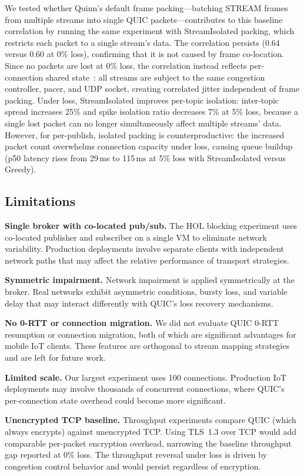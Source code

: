 We tested whether Quinn's default frame packing---batching STREAM frames from multiple streams into single QUIC packets---contributes to this baseline correlation by running the same experiment with StreamIsolated packing, which restricts each packet to a single stream's data. The correlation persists (0.64 versus 0.60 at 0\% loss), confirming that it is not caused by frame co-location. Since no packets are lost at 0\% loss, the correlation instead reflects per-connection shared state~\cite{rfc9002, rfc9308}: all streams are subject to the same congestion controller, pacer, and UDP socket, creating correlated jitter independent of frame packing. Under loss, StreamIsolated improves per-topic isolation: inter-topic spread increases 25\% and spike isolation ratio decreases 7\% at 5\% loss, because a single lost packet can no longer simultaneously affect multiple streams' data. However, for per-publish, isolated packing is counterproductive: the increased packet count overwhelms connection capacity under loss, causing queue buildup (p50 latency rises from 29\,ms to 115\,ms at 5\% loss with StreamIsolated versus Greedy).

\subsection{Limitations}

\textbf{Single broker with co-located pub/sub.} The HOL blocking experiment uses co-located publisher and subscriber on a single VM to eliminate network variability. Production deployments involve separate clients with independent network paths that may affect the relative performance of transport strategies.

\textbf{Symmetric impairment.} Network impairment is applied symmetrically at the broker. Real networks exhibit asymmetric conditions, bursty loss, and variable delay that may interact differently with QUIC's loss recovery mechanisms.

\textbf{No 0-RTT or connection migration.} We did not evaluate QUIC 0-RTT resumption or connection migration, both of which are significant advantages for mobile IoT clients. These features are orthogonal to stream mapping strategies and are left for future work.

\textbf{Limited scale.} Our largest experiment uses 100 connections. Production IoT deployments may involve thousands of concurrent connections, where QUIC's per-connection state overhead could become more significant.

\textbf{Unencrypted TCP baseline.} Throughput experiments compare QUIC (which always encrypts) against unencrypted TCP. Using TLS~1.3 over TCP would add comparable per-packet encryption overhead, narrowing the baseline throughput gap reported at 0\% loss. The throughput reversal under loss is driven by congestion control behavior and would persist regardless of encryption.


